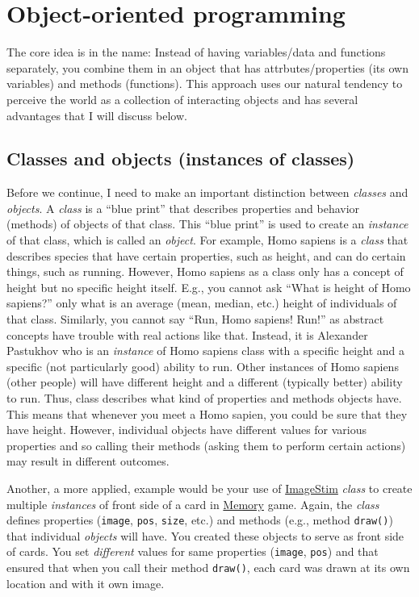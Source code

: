 \documentclass[
]{book}
\begin{document}
\hypertarget{object-oriented-programming}{%
\section{Object-oriented programming}\label{object-oriented-programming}}

The core idea is in the name: Instead of having variables/data and functions separately, you combine them in an object that has attrbutes/properties (its own variables) and methods (functions). This approach uses our natural tendency to perceive the world as a collection of interacting objects and has several advantages that I will discuss below.

\hypertarget{classes-and-objects-instances-of-classes}{%
\subsection{Classes and objects (instances of classes)}\label{classes-and-objects-instances-of-classes}}

Before we continue, I need to make an important distinction between \emph{classes} and \emph{objects}. A \emph{class} is a ``blue print'' that describes properties and behavior (methods) of objects of that class. This ``blue print'' is used to create an \emph{instance} of that class, which is called an \emph{object}. For example, Homo sapiens is a \emph{class} that describes species that have certain properties, such as height, and can do certain things, such as running. However, Homo sapiens as a class only has a concept of height but no specific height itself. E.g., you cannot ask ``What is height of Homo sapiens?'' only what is an average (mean, median, etc.) height of individuals of that class. Similarly, you cannot say ``Run, Homo sapiens! Run!'' as abstract concepts have trouble with real actions like that. Instead, it is Alexander Pastukhov who is an \emph{instance} of Homo sapiens class with a specific height and a specific (not particularly good) ability to run. Other instances of Homo sapiens (other people) will have different height and a different (typically better) ability to run. Thus, class describes what kind of properties and methods objects have. This means that whenever you meet a Homo sapien, you could be sure that they have height. However, individual objects have different values for various properties and so calling their methods (asking them to perform certain actions) may result in different outcomes.

Another, a more applied, example would be your use of \href{https://psychopy.org/api/visual/imagestim.html\#psychopy.visual.ImageStim}{ImageStim} \emph{class} to create multiple \emph{instances} of front side of a card in \href{memory-game}{Memory} game. Again, the \emph{class} defines properties (\texttt{image}, \texttt{pos}, \texttt{size}, etc.) and methods (e.g., method \texttt{draw()}) that individual \emph{objects} will have. You created these objects to serve as front side of cards. You set \emph{different} values for same properties (\texttt{image}, \texttt{pos}) and that ensured that when you call their method \texttt{draw()}, each card was drawn at its own location and with it own image.
\end{document}
